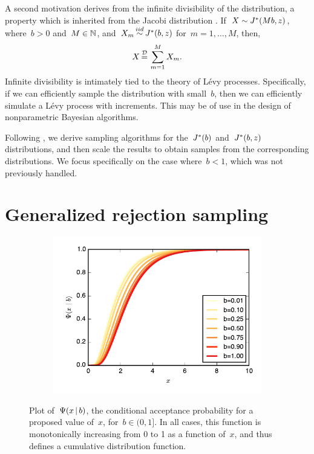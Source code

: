 \documentclass[aos,preprint]{imsart}
\renewcommand{\cite}[1]{\citep{#1}}
\begin{document}
A second motivation derives from the infinite divisibility of the 
\polyagamma distribution, a property which is inherited from the 
Jacobi distribution \cite{biane2001probability}. If~$X \sim J^{*}(Mb,z)$,
where~$b > 0$ and~$M \in \mathbb{N}$, and~$X_m \simiid \distJacobi(b,z)$ 
for~$m=1, \ldots, M$, then,
\begin{align}
X \disteq \sum_{m=1}^M X_m.
\end{align}
Infinite divisibility is intimately tied to the theory of L\'{e}vy processes.
Specifically, if we can efficiently sample the \polyagamma distribution with 
small~$b$, then we can efficiently simulate a L\'{e}vy process with 
\polyagamma increments. This may be of use in the design of nonparametric
Bayesian algorithms.


Following \citet{windle2014sampling}, we derive sampling algorithms for
the~$J^{*}(b)$ and~$J^{*}(b,z)$ distributions,
 and then scale the results to obtain
samples from the corresponding \polyagamma distributions. We focus specifically
on the case where~$b<1$, which was not previously handled. 

\section{Generalized rejection sampling}

\begin{figure}
\centering
  \begin{subfigure}[t]{4in}
    \centering
    \vskip 0pt
    \includegraphics[width=\textwidth]{psi}
  \end{subfigure}
  \vspace{-2em}
  \caption{Plot of~$\Psi(x \,|\, b)$, the conditional acceptance
    probability for a proposed value of~$x$, for~$b\in (0,1]$. In all
    cases, this function is monotonically increasing from 0 to 1 as a
    function of~$x$, and thus defines a cumulative distribution
    function. }
\label{fig:psi}
\end{figure}
\end{document}
